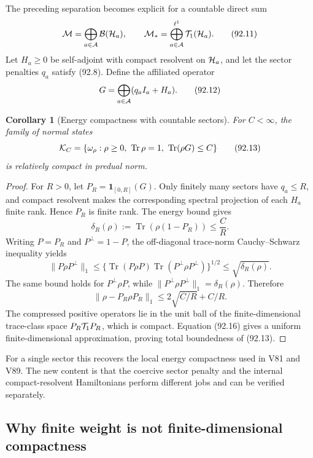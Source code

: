 \documentclass[11pt]{article}
\newtheorem{corollary}[theorem]{Corollary}
\theoremstyle{remark}
\begin{document}
The preceding separation becomes explicit for a countable direct
sum
\[
 {\cal M}=\bigoplus_{a\in{\cal A}}{\cal B}({\cal H}_a),\qquad
 {\cal M}_*=\bigoplus_{a\in{\cal A}}^{\ell^1}
 {\cal T}_1({\cal H}_a).                                        \tag{92.11}
\]
Let \(H_a\geq0\) be self-adjoint with compact resolvent on
\({\cal H}_a\), and let the sector penalties \(q_a\) satisfy
(92.8).  Define the affiliated operator
\[
 G=\bigoplus_{a\in{\cal A}}(q_a I_a+H_a).                         \tag{92.12}
\]

\begin{corollary}[Energy compactness with countable sectors]
\label{cor:v12v92-energy}
For \(C<\infty\), the family of normal states
\[
 {\cal K}_C=
 \{\omega_\rho:\rho\geq0,\ \operatorname{Tr}\rho=1,\
                  \operatorname{Tr}(\rho G)\leq C\}              \tag{92.13}
\]
is relatively compact in predual norm.
\end{corollary}

\begin{proof}
For \(R>0\), let \(P_R=\mathbf 1_{[0,R]}(G)\).  Only finitely many
sectors have \(q_a\leq R\), and compact resolvent makes the
corresponding spectral projection of each \(H_a\) finite rank.
Hence \(P_R\) is finite rank.  The energy bound gives
\[
 \delta_R(\rho):=\operatorname{Tr}(\rho(1-P_R))
 \leq\frac{C}{R}.                                                \tag{92.14}
\]
Writing \(P=P_R\) and \(P^\perp=1-P\), the off-diagonal trace-norm
Cauchy--Schwarz inequality yields
\[
 \|P\rho P^\perp\|_1
 \leq
 \{\operatorname{Tr}(P\rho P)
   \operatorname{Tr}(P^\perp\rho P^\perp)\}^{1/2}
 \leq\sqrt{\delta_R(\rho)}.                                      \tag{92.15}
\]
The same bound holds for \(P^\perp\rho P\), while
\(\|P^\perp\rho P^\perp\|_1=\delta_R(\rho)\).  Therefore
\[
 \|\rho-P_R\rho P_R\|_1
 \leq2\sqrt{C/R}+C/R.                                            \tag{92.16}
\]
The compressed positive operators lie in the unit ball of the
finite-dimensional trace-class space
\(P_R{\cal T}_1P_R\), which is compact.  Equation (92.16) gives a
uniform finite-dimensional approximation, proving total boundedness
of (92.13).
\end{proof}

For a single sector this recovers the local energy compactness used
in V81 and V89.  The new content is that the coercive sector penalty
and the internal compact-resolvent Hamiltonians perform different
jobs and can be verified separately.

\subsection{Why finite weight is not finite-dimensional
compactness}
\end{document}

